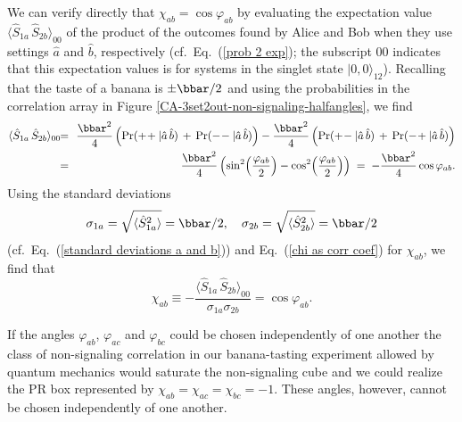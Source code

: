 We can verify directly that $\chi_{ab} = \cos{\varphi_{ab}}$ by evaluating the expectation value $\langle \hat{S}_{1a} \, \hat{S}_{2b} \rangle_{00}$ of the product of the outcomes found by Alice and Bob when they use settings $\hat{a}$ and $\hat{b}$, respectively (cf.\ Eq.\ (\ref{prob 2 exp}); the subscript $00$ indicates that this expectation values is for systems in the singlet state $|0, 0 \rangle_{12}$). Recalling that the taste of a banana is $\pm \bbar/2$ and using the probabilities in the correlation array in Figure \ref{CA-3set2out-non-signaling-halfangles}, we find
\begin{eqnarray}
\langle \hat{S}_{1a} \, \hat{S}_{2b} \rangle_{00} & \!\! = \!\! & \frac{\bbar^2}{4} \left(\mathrm{Pr}(+\!+| \hat{a} \,\hat{b}) \, + \, \mathrm{Pr}(-\!-| \hat{a} \,\hat{b})\right) 
- \frac{\bbar^2}{4} \left(\mathrm{Pr}(+\!-| \hat{a} \,\hat{b}) \, + \, \mathrm{Pr}(-\!+| \hat{a} \,\hat{b})\right) \nonumber \\
&  \!\! = \!\! & \frac{\bbar^2}{4} \left(  \sin^2{\!\left(\frac{\varphi_{ab}}{2}\right)} - \cos^2{\!\left(\frac{\varphi_{ab}}{2}\right)} \right) \; = \; -\frac{\bbar^2}{4}\cos{\varphi_{ab}}.
\label{prob 2 exp b}
\end{eqnarray}
Using the standard deviations 
\begin{equation}
\sigma_{1a} = \sqrt{\langle \hat{S}^2_{1a} \rangle} = \bbar/2, \quad \sigma_{2b} = \sqrt{\langle \hat{S}^2_{2b} \rangle} = \bbar/2
\label{standard deviations a b}
\end{equation}
(cf.\ Eq.\ (\ref{standard deviations a and b})) and Eq.\ (\ref{chi as corr coef}) for $\chi_{ab}$, we find that 
\begin{equation}
\chi_{ab} \equiv  - \frac{\langle \hat{S}_{1a} \, \hat{S}_{2b} \rangle_{00}}{\sigma_{1a} \sigma_{2b}}  = \cos{\varphi_{ab}}. 
\label{chi2angle}
\end{equation}    

If the angles $\varphi_{ab}$, $\varphi_{ac}$ and $\varphi_{bc}$ could be chosen independently of one another the class of non-signaling correlation in our banana-tasting experiment allowed by quantum mechanics would saturate the non-signaling cube and we could realize the PR box represented by $\chi_{ab} = \chi_{ac} = \chi_{bc} = -1$. These angles, however, cannot be chosen independently of one another. 

